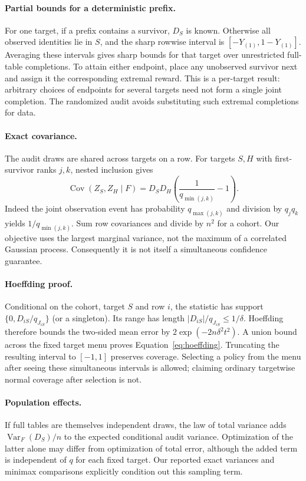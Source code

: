 \documentclass[12pt]{clear2027}
\newcommand{\Var}{\operatorname{Var}}
\begin{document}
\paragraph{Partial bounds for a deterministic prefix.}
For one target, if a prefix contains a survivor, $D_S$ is known. Otherwise all observed identities lie in $S$, and the sharp rowwise interval is $[-Y_{(1)},1-Y_{(1)}]$. Averaging these intervals gives sharp bounds for that target over unrestricted full-table completions. To attain either endpoint, place any unobserved survivor next and assign it the corresponding extremal reward. This is a per-target result: arbitrary choices of endpoints for several targets need not form a single joint completion. The randomized audit avoids substituting such extremal completions for data.

\paragraph{Exact covariance.}
The audit draws are shared across targets on a row. For targets $S,H$ with first-survivor ranks $j,k$, nested inclusion gives
\begin{equation}
 \operatorname{Cov}(Z_S,Z_H\mid F)
 =D_SD_H\left(\frac1{q_{\min(j,k)}}-1\right).
\end{equation}
Indeed the joint observation event has probability $q_{\max(j,k)}$ and division by $q_jq_k$ yields $1/q_{\min(j,k)}$. Sum row covariances and divide by $n^2$ for a cohort. Our objective uses the largest marginal variance, not the maximum of a correlated Gaussian process. Consequently it is not itself a simultaneous confidence guarantee.

\paragraph{Hoeffding proof.}
Conditional on the cohort, target $S$ and row $i$, the statistic has support $\{0,D_{iS}/q_{J_{iS}}\}$ (or a singleton). Its range has length $|D_{iS}|/q_{J_{iS}}\le1/\delta$. Hoeffding therefore bounds the two-sided mean error by $2\exp(-2n\delta^2t^2)$. A union bound across the fixed target menu proves Equation~\eqref{eq:hoeffding}. Truncating the resulting interval to $[-1,1]$ preserves coverage. Selecting a policy from the menu after seeing these simultaneous intervals is allowed; claiming ordinary targetwise normal coverage after selection is not.

\paragraph{Population effects.}
If full tables are themselves independent draws, the law of total variance adds $\Var_F(D_S)/n$ to the expected conditional audit variance. Optimization of the latter alone may differ from optimization of total error, although the added term is independent of $q$ for each fixed target. Our reported exact variances and minimax comparisons explicitly condition out this sampling term.
\end{document}
